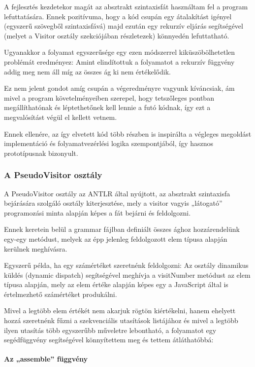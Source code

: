 A fejlesztés kezdetekor magát az absztrakt szintaxisfát használtam fel a program lefuttatására. Ennek pozitívuma, hogy a kód csupán egy átalakítást igényel (egyszerű szövegből szintaxisfává) majd ezután egy rekurzív eljárás segítségével (melyet a Visitor osztály szekciójában részletezek) könnyedén lefuttatható.

Ugyanakkor a folyamat egyszerűsége egy ezen módszerrel kiküszöbölhetetlen problémát eredményez: Amint elindítottuk a folyamatot a rekurzív függvény addig meg nem áll míg az összes ág ki nem értékelődik. 

Ez nem jelent gondot amíg csupán a végeredményre vagyunk kíváncsiak, ám mivel a program követelményeiben szerepel, hogy tetszőleges pontban megállíthatónak és léptethetőnek kell lennie a futó kódnak, így ezt a megvalósítást végül el kellett vetnem.

Ennek ellenére, az így elvetett kód több részben is inspirálta a végleges megoldást implementáció és folyamatvezérlési logika szempontjából, így hasznos prototípusnak bizonyult.

\subsubsection{A PseudoVisitor osztály}

A PseudoVisitor osztály az ANTLR által nyújtott, az absztrakt szintaxisfa bejárására szolgáló osztály kiterjesztése, mely a visitor vagyis „látogató” programozási minta alapján képes a fát bejárni és feldolgozni.

Ennek keretein belül a grammar fájlban definiált összes ághoz hozzárendelünk egy-egy metódust, melyek az épp jelenleg feldolgozott elem típusa alapján kerülnek meghívásra.

Egyszerű példa, ha egy számértéket szeretnénk feldolgozni: Az osztály dinamikus küldés (dynamic dispatch) segítségével meghívja a visitNumber metódust az elem típusa alapján, mely az elem értéke alapján képes egy a JavaScript által is értelmezhető számértéket produkálni.

Mivel a legtöbb elem értékét nem akarjuk rögtön kiértékelni, hanem ehelyett hozzá szeretnénk fűzni a szekvenciális utasítások listájához és mivel a legtöbb ilyen utasítás több egyszerűbb műveletre lebontható, a folyamatot egy segédfüggvény segítségével könnyítettem meg és tettem átláthatóbbá:

\paragraph{Az „assemble” függvény}

